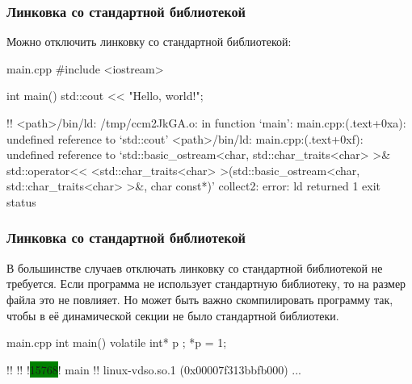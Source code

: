 \documentclass[compress, 8pt, aspectratio=169]{beamer}
\begin{document}
  \begin{frame}[fragile]

    \frametitle{Линковка со стандартной библиотекой}

    Можно отключить линковку со стандартной библиотекой:

    \begin{mytitledinplacelisting}[minted language=cpp]{main.cpp}
#include <iostream>

int main() {
    std::cout << "Hello, world!\n";
}
    \end{mytitledinplacelisting}

    \begin{terminalwindow}
!!
<path>/bin/ld: /tmp/ccm2JkGA.o: in function `main':
main.cpp:(.text+0xa): undefined reference to `std::cout'
<path>/bin/ld: main.cpp:(.text+0xf): undefined reference to `std::basic_ostream<char, std::char_traits<char> >& std::operator<< <std::char_traits<char> >(std::basic_ostream<char, std::char_traits<char> >&, char const*)'
collect2: error: ld returned 1 exit status
    \end{terminalwindow}

  \end{frame}

  \begin{frame}[fragile]

    \frametitle{Линковка со стандартной библиотекой}

    В большинстве случаев отключать линковку со стандартной библиотекой не требуется.
    Если программа не использует стандартную библиотеку,
    то на размер файла это не повлияет.
    Но может быть важно скомпилировать программу так, чтобы в её динамической
    секции не было стандартной библиотеки.

    \begin{mytitledinplacelisting}[minted language=cpp]{main.cpp}
int main() {
    volatile int* p {};
    *p = 1;
}
    \end{mytitledinplacelisting}

    \begin{terminalwindow}
!!
!!
!\colorbox{green}{15768}!   main
!!
linux-vdso.so.1 (0x00007f313bbfb000)
...
    \end{terminalwindow}

  \end{frame}
\end{document}
